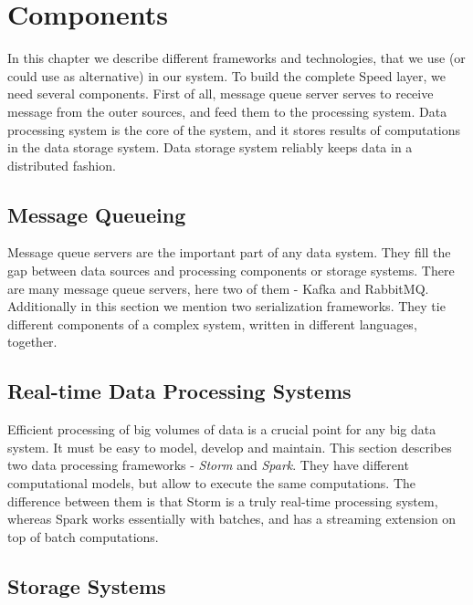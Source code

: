 \chapter{Components}
\label{chap:components}

In this chapter we describe different frameworks and technologies, that we use (or could use as alternative) in our system.
To build the complete Speed layer, we need several components.
First of all, message queue server serves to receive message from the outer sources, and feed them to the processing system.
Data processing system is the core of the system, and it stores results of computations in the data storage system.
Data storage system reliably keeps data in a distributed fashion. 

\section{Message Queueing}

Message queue servers are the important part of any data system.
They fill the gap between data sources and processing components or storage systems.
There are many message queue servers, here two of them - Kafka and RabbitMQ.
Additionally in this section we mention two serialization frameworks.
They tie different components of a complex system, written in different languages, together.






\section{Real-time Data Processing Systems}

Efficient processing of big volumes of data is a crucial point for any big data system.
It must be easy to model, develop and maintain.
This section describes two data processing frameworks - \textit{Storm} and \textit{Spark}.
They have different computational models, but allow to execute the same computations.
The difference between them is that Storm is a truly real-time processing system, whereas Spark works essentially with batches, and has a streaming extension on top of batch computations.




\section{Storage Systems}

